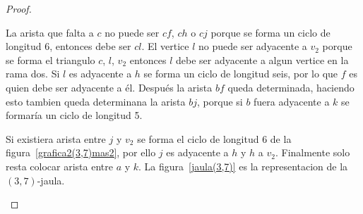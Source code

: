 \documentclass[12pt]{book}
\theoremstyle{definition}
\begin{document}
\begin{proof}
\begin{figure}
  \caption{} \label{grafica1(3,7)mas2}
\end{figure}


La arista que falta a $c$ no puede ser $cf$, $ch$ o $cj$ porque se forma
un ciclo de longitud 6, entonces debe ser  $cl$. El vertice $l$ no
puede ser adyacente a $v_2$ porque se forma el triangulo $c$, $l$,
$v_2$ entonces $l$ debe ser adyacente a algun vertice en la rama
dos. Si $l$ es adyacente a $h$ se forma un ciclo de longitud seis, por lo
que $f$ es quien debe ser adyacente a él. Después la arista $bf$ queda
determinada, haciendo esto tambien queda determinana la arista $bj$,
porque si $b$ fuera adyacente a  $k$ se formaría un ciclo de longitud
5.

Si existiera arista entre $j$ y $v_2$ se forma el ciclo de longitud 6 de la
figura~\ref{grafica2(3,7)mas2}, por ello $j$ es adyacente a  $h$ y $h$
a $v_2$. Finalmente solo resta colocar arista entre $a$ y $k$. La
figura~\ref{jaula(3,7)} es la representacion de la $(3,7)$-jaula.

\begin{figure}
  \centering
\end{figure}
\end{proof}
\end{document}

